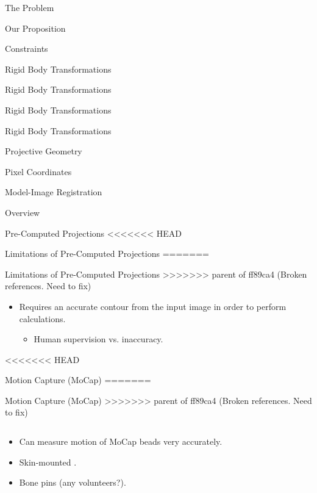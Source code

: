 \documentclass[presentation, aspectratio=1610]{beamer}
\begin{document}
\begin{frame}[label={sec:org51bdd62}]{The Problem}
\begin{frame}[label={sec:org827823c}]{Our Proposition}
\begin{frame}[label={sec:org8655799}]{Constraints}
\begin{frame}[label={sec:orgb624cd0}]{Rigid Body Transformations}
\begin{frame}[label={sec:org66cfa5c}]{Rigid Body Transformations}
\begin{frame}[label={sec:orga8040ec}]{Rigid Body Transformations}
\begin{frame}[label={sec:org2c45bb0}]{Rigid Body Transformations}
\begin{frame}[label={sec:orgc08b8a8}]{Projective Geometry}
\begin{frame}[label={sec:org9004faf}]{Pixel Coordinates}
\begin{frame}[label={sec:orgf5a9f37}]{Model-Image Registration}
\begin{frame}[label={sec:orgd132949}]{Overview}
\begin{frame}[label={sec:org3bacc15}]{Pre-Computed Projections}
<<<<<<< HEAD
\begin{frame}[label={sec:org9c71b5d}]{Limitations of Pre-Computed Projections}
=======
\begin{frame}[label={sec:orgaeaba1d}]{Limitations of Pre-Computed Projections}
>>>>>>> parent of ff89ca4 (Broken references. Need to fix)
\begin{itemize}
\item Requires an accurate contour from the input image in order to perform calculations.
\begin{itemize}
\item Human supervision vs. inaccuracy.
\end{itemize}
\end{itemize}
\end{frame}

<<<<<<< HEAD
\begin{frame}[label={sec:org0b4ee4b}]{Motion Capture (MoCap)}
=======
\begin{frame}[label={sec:org5b44d59}]{Motion Capture (MoCap)}
>>>>>>> parent of ff89ca4 (Broken references. Need to fix)
\begin{columns}
\begin{column}{0.5\columnwidth}
\begin{itemize}
\item Can measure motion of MoCap beads very accurately.
\item Skin-mounted \autocites{gaoInvestigationSoftTissue2008}[][]{kuoInfluenceSoftTissue2011}[][]{linEffectsSoftTissue2016}.
\item Bone pins \autocite{lafortuneThreedimensionalKinematicsHuman1992} (any volunteers?).
\end{itemize}
\end{column}


\end{columns}
\end{frame}
\end{frame}
\end{frame}
\end{frame}
\end{frame}
\end{frame}
\end{frame}
\end{frame}
\end{frame}
\end{frame}
\end{frame}
\end{frame}
\end{frame}
\end{frame}
\end{frame}
\end{document}
